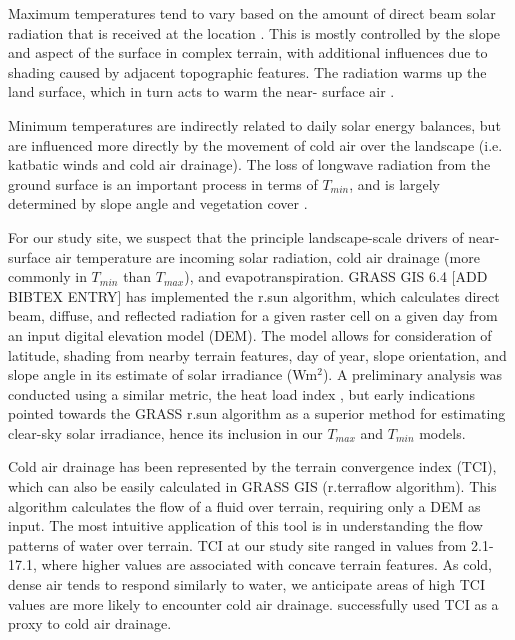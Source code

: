 \documentclass{ametsoc}
\begin{document}
Maximum temperatures tend to vary based on the amount of direct beam solar
radiation that is received at the location \citep{Geiger2009}.  This is mostly
controlled by the slope and aspect of the surface in complex terrain, with
additional influences due to shading caused by adjacent topographic features.
The radiation warms up the land surface, which in turn acts to warm the near-
surface air \citep{Geiger2009}.

Minimum temperatures are indirectly related to daily solar energy balances, but
are influenced more directly by the movement of cold air over the landscape
(i.e. katbatic winds and cold air drainage).  The loss of longwave radiation
from the ground surface is an important process in terms of $T_{min}$, and is
largely determined by slope angle and vegetation cover
\citep{Fridley2009,Geiger2009}.

For our study site, we suspect that the principle landscape-scale drivers of
near-surface air temperature are incoming solar radiation, cold air drainage
(more commonly in $T_{min}$ than $T_{max}$), and evapotranspiration.  GRASS GIS
6.4 [ADD BIBTEX ENTRY] has implemented the r.sun algorithm, which calculates
direct beam, diffuse, and reflected radiation for a given raster cell on a given
day from an input digital elevation model (DEM).  The model allows for
consideration of latitude, shading from nearby terrain features, day of year,
slope orientation, and slope angle in its estimate of solar irradiance (Wm$^2$).
A preliminary analysis was conducted using a similar metric, the heat load index
\citep{McCune2002}, but early indications pointed towards the GRASS r.sun
algorithm as a superior method for estimating clear-sky solar irradiance, hence
its inclusion in our $T_{max}$ and $T_{min}$ models.

Cold air drainage has been represented by the terrain convergence index (TCI),
which can also be easily calculated in GRASS GIS (r.terraflow algorithm).  This
algorithm calculates the flow of a fluid over terrain, requiring only a DEM as
input.  The most intuitive application of this tool is in understanding the flow
patterns of water over terrain.  TCI at our study site ranged in values from
2.1-17.1, where higher values are associated with concave terrain features.  As
cold, dense air tends to respond similarly to water, we anticipate areas of high
TCI values are more likely to encounter cold air drainage.
\citet{Dobrowski2009} successfully used TCI as a proxy to cold air drainage.
\end{document}
